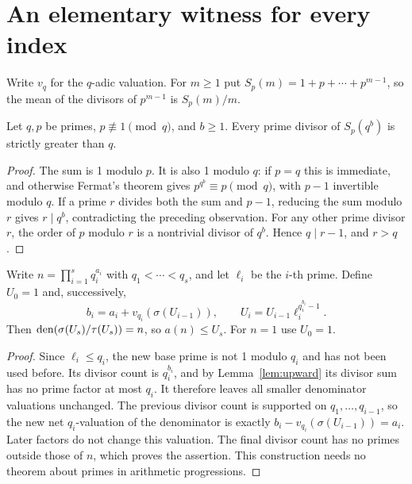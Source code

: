 \section{An elementary witness for every index}\label{sec:elementary}
Write $v_q$ for the $q$-adic valuation. For $m\ge1$ put
$S_p(m)=1+p+\cdots+p^{m-1}$, so the mean of the
divisors of $p^{m-1}$ is $S_p(m)/m$.

\begin{lemma}\label{lem:upward}
Let $q,p$ be primes, $p\not\equiv1\pmod q$, and $b\ge1$.
Every prime divisor of $S_p(q^b)$ is strictly greater than $q$.
\end{lemma}
\begin{proof}
The sum is 1 modulo $p$. It is also 1 modulo $q$: if $p=q$ this is
immediate, and otherwise Fermat's theorem gives
$p^{q^b}\equiv p\pmod q$, with $p-1$ invertible modulo $q$.
If a prime $r$ divides both the sum and $p-1$, reducing the sum modulo
$r$ gives $r\mid q^b$, contradicting the preceding observation.
For any other prime divisor $r$, the order of $p$ modulo $r$ is a
nontrivial divisor of $q^b$. Hence $q\mid r-1$, and $r>q$.
\end{proof}

\begin{theorem}\label{thm:elementary}
Write $n=\prod_{i=1}^s q_i^{a_i}$ with $q_1<\cdots<q_s$, and let
$\ell_i$ be the $i$-th prime. Define $U_0=1$ and, successively,
\begin{equation}\label{eq:elementary-bound}
 b_i=a_i+v_{q_i}(\sigma(U_{i-1})),\qquad
 U_i=U_{i-1}\ell_i^{q_i^{b_i}-1}.
\end{equation}
Then $\operatorname{den}(\sigma(U_s)/\tau(U_s))=n$, so $a(n)\le U_s$.
For $n=1$ use $U_0=1$.
\end{theorem}
\begin{proof}
Since $\ell_i\le q_i$, the new base prime is not 1 modulo $q_i$ and
has not been used before. Its divisor count is $q_i^{b_i}$, and by
Lemma~\ref{lem:upward} its divisor sum has no prime factor at most $q_i$.
It therefore leaves all smaller denominator valuations unchanged.
The previous divisor count is supported on $q_1,\ldots,q_{i-1}$,
so the new net $q_i$-valuation of the denominator is exactly
$b_i-v_{q_i}(\sigma(U_{i-1}))=a_i$. Later factors do not change this
valuation. The final divisor count has no primes outside those of $n$,
which proves the assertion. This construction needs no theorem about
primes in arithmetic progressions.
\end{proof}

